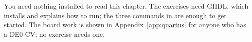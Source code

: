 You need nothing installed to read this chapter. The exercises need GHDL, which
 installs and explains how to run; the three commands in  are
enough to get started. The board work is shown in Appendix~\ref{app:quartus} for anyone who has a
DE0-CV; no exercise needs one.




